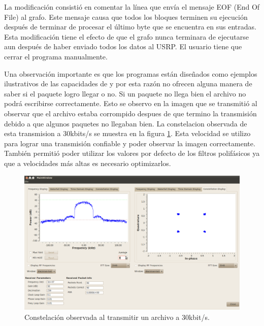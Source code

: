 La modificaci\'on consisti\'o en comentar la l\'inea que env\'ia el mensaje EOF (End Of File) al
grafo. Este mensaje causa que todos los bloques terminen su ejecuci\'on despu\'es de terminar de
procesar el \'ultimo byte que se encuentra en sus entradas. Esta modificaci\'on tiene el efecto de
que el grafo nunca terminara de ejecutarse aun despu\'es de haber enviado todos los datos al USRP.
El usuario tiene que cerrar el programa manualmente.

Una observaci\'on importante es que los programas est\'an dise\~nados como ejemplos ilustrativos de
las capacidades de \gnuradio y por esta raz\'on no ofrecen alguna manera de saber si el paquete
logro llegar o no. Si un paquete no llega bien el archivo no podr\'a escribirse correctamente. Esto
se observo en la imagen que se transmiti\'o al observar que el archivo estaba corrompido
despues de que termino la transmisi\'on debido a que algunos paquetes no llegaban bien. La
constelacion observada de esta transmision a 30kbits/s se muestra en la figura \ref{fig:fileconst}.
Esta velocidad se utilizo para lograr una transmisi\'on confiable y poder observar la imagen
correctamente. Tambi\'en permiti\'o poder utilizar los valores por defecto de los filtros polif\'asicos
ya que a velocidades m\'as altas es necesario optimizarlos.

\begin{figure}[htp]
  \centering
  \includegraphics[width=5.8in]{figs/fileconst}
  \vspace{0.3in}
  \caption{Constelaci\'on observada al transmitir un archivo a 30kbit/s.}
  \label{fig:fileconst}
\end{figure}
